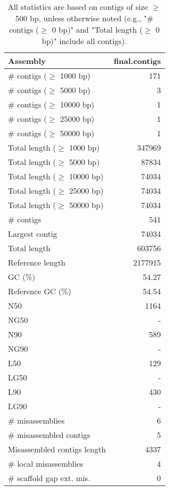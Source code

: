 \documentclass[12pt,a4paper]{article}
\begin{document}
\begin{table}[ht]
\begin{center}
\caption{All statistics are based on contigs of size $\geq$ 500 bp, unless otherwise noted (e.g., "\# contigs ($\geq$ 0 bp)" and "Total length ($\geq$ 0 bp)" include all contigs).}
\begin{tabular}{|l*{1}{|r}|}
\hline
Assembly & final.contigs \\ \hline
\# contigs ($\geq$ 1000 bp) & 171 \\ \hline
\# contigs ($\geq$ 5000 bp) & 3 \\ \hline
\# contigs ($\geq$ 10000 bp) & 1 \\ \hline
\# contigs ($\geq$ 25000 bp) & 1 \\ \hline
\# contigs ($\geq$ 50000 bp) & 1 \\ \hline
Total length ($\geq$ 1000 bp) & 347969 \\ \hline
Total length ($\geq$ 5000 bp) & 87834 \\ \hline
Total length ($\geq$ 10000 bp) & 74034 \\ \hline
Total length ($\geq$ 25000 bp) & 74034 \\ \hline
Total length ($\geq$ 50000 bp) & 74034 \\ \hline
\# contigs & 541 \\ \hline
Largest contig & 74034 \\ \hline
Total length & 603756 \\ \hline
Reference length & 2177915 \\ \hline
GC (\%) & 54.27 \\ \hline
Reference GC (\%) & 54.54 \\ \hline
N50 & 1164 \\ \hline
NG50 & - \\ \hline
N90 & 589 \\ \hline
NG90 & - \\ \hline
L50 & 129 \\ \hline
LG50 & - \\ \hline
L90 & 430 \\ \hline
LG90 & - \\ \hline
\# misassemblies & 6 \\ \hline
\# misassembled contigs & 5 \\ \hline
Misassembled contigs length & 4337 \\ \hline
\# local misassemblies & 4 \\ \hline
\# scaffold gap ext. mis. & 0 \\ \hline

\end{tabular}
\end{center}
\end{table}
\end{document}
